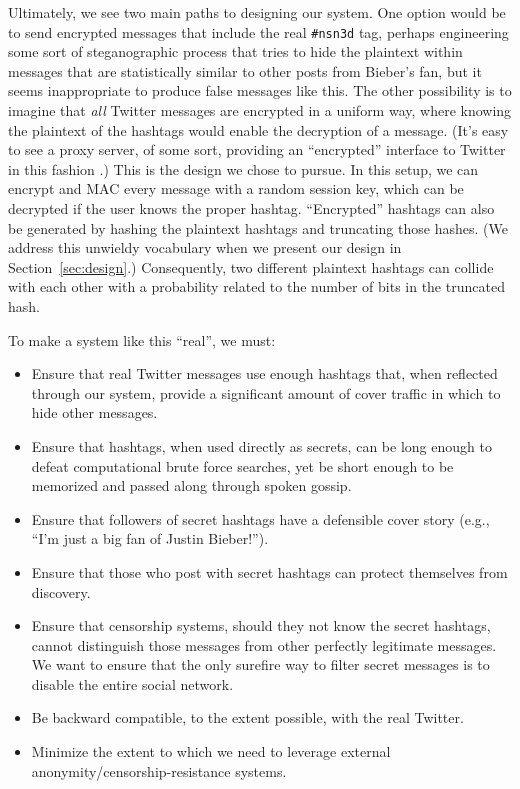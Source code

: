 Ultimately, we see two main paths to designing our system. One option would be to send encrypted messages that include the real {\tt \#nsn3d} tag, perhaps engineering some sort of steganographic process that tries to hide the plaintext within messages that are statistically similar to other posts from Bieber's fan, but it seems inappropriate to produce false messages like this. The other possibility is to imagine that {\em all} Twitter messages are encrypted in a uniform way, where knowing the plaintext of the hashtags would enable the decryption of a message. (It's easy to see a proxy server, of some sort, providing an ``encrypted'' interface to Twitter in this fashion%
.) This is the design we chose to pursue. In this setup, we can encrypt and MAC every message with a random session key, which can be decrypted if the user knows the proper hashtag. ``Encrypted'' hashtags can also be generated by hashing the plaintext hashtags and truncating those hashes.  (We address this unwieldy vocabulary when we present our design in Section~\ref{sec:design}.) Consequently, two different plaintext hashtags can collide with each other with a probability related to the number of bits in the truncated hash.

To make a system like this ``real'', we must:
\begin{itemize}
\item Ensure that real Twitter messages use enough hashtags that, when reflected through our system, provide a significant amount of cover traffic in which to hide other messages.
\item Ensure that hashtags, when used directly as secrets, can be long enough to defeat computational brute force searches, yet be short enough to be memorized and passed along through spoken gossip.
\item Ensure that followers of secret hashtags have a defensible cover story (e.g., ``I'm just a big fan of Justin Bieber!'').
\item Ensure that those who post with secret hashtags can protect themselves from discovery.
\item Ensure that censorship systems, should they not know the secret hashtags, cannot distinguish those messages from other perfectly legitimate messages. We want to ensure that the only surefire way to filter secret messages is to disable the entire social network.
\item Be backward compatible, to the extent possible, with the real Twitter.
\item Minimize the extent to which we need to leverage external anonymity/censorship-resistance systems.
\end{itemize}
\fi

